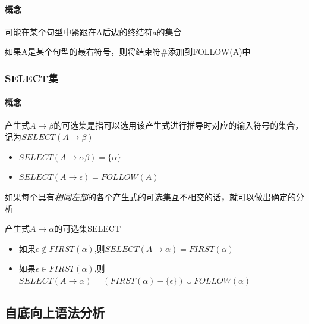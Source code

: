 \documentclass[UTF8]{ctexart} %
\begin{document}
\paragraph{概念} 可能在某个句型中紧跟在A后边的终结符a的集合

如果A是某个句型的最右符号，则将结束符\#添加到FOLLOW(A)中

\subsubsection{SELECT集}

\paragraph{概念} 产生式$A\rightarrow \beta$的可选集是指可以选用该产生式进行推导时对应的输入符号的集合，记为$SELECT(A\rightarrow \beta)$

\begin{itemize}
    \item $SELECT(A\rightarrow \alpha\beta)=\{\alpha\}$
    \item $SELECT(A\rightarrow \epsilon)=FOLLOW(A)$
\end{itemize}

如果每个具有\emph{相同左部}的各个产生式的可选集互不相交的话，就可以做出确定的分析

产生式$A\rightarrow \alpha$的可选集SELECT

\begin{itemize}
    \item 如果$\epsilon \notin FIRST(\alpha)$,则$SELECT(A\rightarrow\alpha)=FIRST(\alpha)$
    \item 如果$\epsilon \in FIRST(\alpha)$,则$SELECT(A\rightarrow\alpha)=(FIRST(\alpha)-\{\epsilon\})\cup FOLLOW(\alpha)$
\end{itemize}

\subsection{自底向上语法分析}
\end{document}

